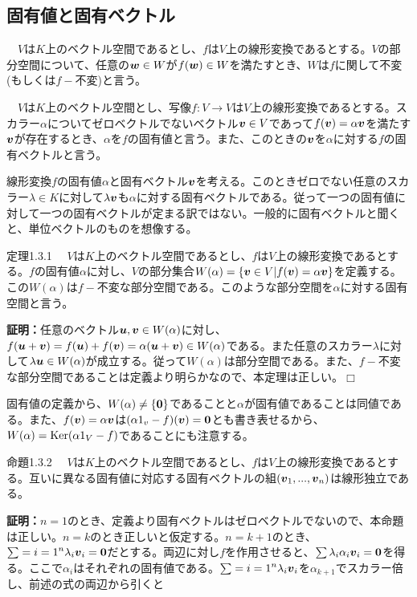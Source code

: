 \documentclass[dvipdfmx, 9pt, a4paper]{jsarticle}
\numberwithin{equation}{subsection}
\newcommand{\bm}[1]{{\mbox{\boldmath $#1$}}}
\def\qed{\hfill $\Box$}
\begin{document}
\subsection{固有値と固有ベクトル}
\begin{tcolorbox}[title=不変部分空間]
　$V$は$K$上のベクトル空間であるとし、$f$は$V$上の線形変換であるとする。$V$の部分空間について、任意の$\bm w \in W$が$f(\bm w) \in W$を満たすとき、$W$は$f$に関して不変(もしくは$f-$不変)と言う。
\end{tcolorbox}
\begin{tcolorbox}[title=固有値と固有ベクトル]
　$V$は$K$上のベクトル空間とし、写像$f:V \to V$は$V$上の線形変換であるとする。スカラー$\alpha$についてゼロベクトルでないベクトル$\bm v \in V$であって$f(\bm v)=\alpha \bm v$を満たす$\bm v$が存在するとき、$\alpha$を$f$の固有値と言う。また、このときの$\bm v$を$\alpha$に対する$f$の固有ベクトルと言う。
\end{tcolorbox}
線形変換$f$の固有値$\alpha$と固有ベクトル$\bm v$を考える。このときゼロでない任意のスカラー$\lambda \in K$に対して$\lambda \bm v$も$\alpha$に対する固有ベクトルである。従って一つの固有値に対して一つの固有ベクトルが定まる訳ではない。一般的に固有ベクトルと聞くと、単位ベクトルのものを想像する。
\begin{itembox}[l]{定理1.3.1}
　$V$は$K$上のベクトル空間であるとし、$f$は$V$上の線形変換であるとする。$f$の固有値$\alpha$に対し、$V$の部分集合$W(\alpha)=\{ \bm v \in V|f(\bm v)=\alpha \bm v \}$を定義する。この$W(\alpha)$は$f-$不変な部分空間である。このような部分空間を$\alpha$に対する固有空間と言う。
\end{itembox}
{\bf 証明：}任意のベクトル$\bm u, \bm v \in W(\alpha)$に対し、$f(\bm u+\bm v)=f(\bm u)+f(\bm v)=\alpha(\bm u+\bm v) \in W(\alpha)$である。また任意のスカラー$\lambda$に対して$\lambda \bm u \in W(\alpha)$が成立する。従って$W(\alpha)$は部分空間である。また、$f-$不変な部分空間であることは定義より明らかなので、本定理は正しい。\qed \par
固有値の定義から、$W(\alpha) \neq \{ \bm 0\}$であることと$\alpha$が固有値であることは同値である。また、$f(\bm v)=\alpha \bm v$は$(\alpha 1_v-f)(\bm v)=\bm 0$とも書き表せるから、$W(\alpha)={\rm Ker}(\alpha 1_V-f)$であることにも注意する。
\begin{itembox}[l]{命題1.3.2}
　$V$は$K$上のベクトル空間であるとし、$f$は$V$上の線形変換であるとする。互いに異なる固有値に対応する固有ベクトルの組$(\bm v_1, ..., \bm v_n)$は線形独立である。
\end{itembox}
{\bf 証明：}$n=1$のとき、定義より固有ベクトルはゼロベクトルでないので、本命題は正しい。$n=k$のとき正しいと仮定する。$n=k+1$のとき、$\sum={i=1}^n \lambda_i\bm v_i=\bm 0$だとする。両辺に対し$f$を作用させると、$\sum \lambda_i\alpha_i\bm v_i=\bm 0$を得る。ここで$\alpha_i$はそれぞれの固有値である。$\sum={i=1}^n \lambda_i\bm v_i$を$\alpha_{k+1}$でスカラー倍し、前述の式の両辺から引くと
\end{document}
